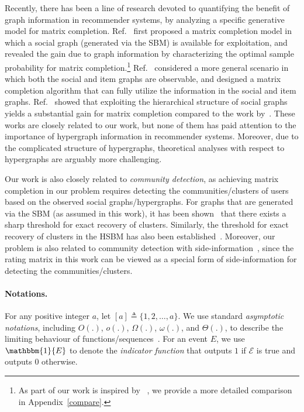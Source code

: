 \documentclass{article}
\begin{document}
Recently, there has been a line of research devoted to quantifying the benefit of graph information in recommender systems, by analyzing a specific generative model for matrix completion.
Ref.~\cite{ahn2018binary} first proposed a matrix completion model in which a social graph (generated via the SBM) is available for exploitation, and revealed the gain due to graph information by characterizing the optimal sample probability for matrix completion.\footnote{As part of our work is inspired by ~\cite{ahn2018binary}, we provide a more detailed comparison in Appendix~\ref{compare}.} Ref.~\cite{zhang2021community, zhang2022mc2g} considered a more general scenario in which both the social and item graphs are observable, and designed a matrix completion algorithm that can fully utilize the information in the social and item graphs. Ref.~\cite{elmahdy2020matrix} showed that exploiting the hierarchical structure of social graphs yields a substantial gain for matrix completion compared to the work by~\citep{ahn2018binary}. These works are closely related to our work, but none of them has paid attention to the importance of hypergraph information in recommender systems. Moreover, due to the complicated structure of hypergraphs, theoretical analyses with respect to hypergraphs are arguably more challenging.  

 Our work is also closely related to \emph{community detection}, as achieving matrix completion in our problem requires detecting the communities/clusters of users based on the observed social graphs/hypergraphs. For graphs that are generated via the SBM (as assumed in this work), it has been shown~\citep{abbe2015exact,mossel2015consistency} that there exists a sharp   threshold for exact recovery of clusters. Similarly, the threshold for exact recovery of clusters in the HSBM has also been established~\citep{kim2018stochastic,zhang2022exact}. Moreover, our problem is also related to community detection with side-information~\citep{saad2018community, esmaeili2019exact, sima2021exact}, since the rating matrix in this work can be viewed as a special form of side-information for detecting the communities/clusters. 

\vspace{-4pt}

\paragraph{Notations.} For any positive integer $a$, let $[a] \triangleq \{1, 2, \ldots, a\}$. We use standard \emph{asymptotic notations}, including $O(.)$, $o(.)$, $\Omega(.)$, $\omega(.)$, and $\Theta(.)$, to describe the limiting behaviour of functions/sequences~\cite[Chapter~3.1]{leiserson1994introduction}. For an event $E$, we use $\mathbbm{1}\{E\}$ to denote the \emph{indicator function} that outputs $1$ if $\mathcal{E}$ is true and outputs $0$ otherwise.
\end{document}
